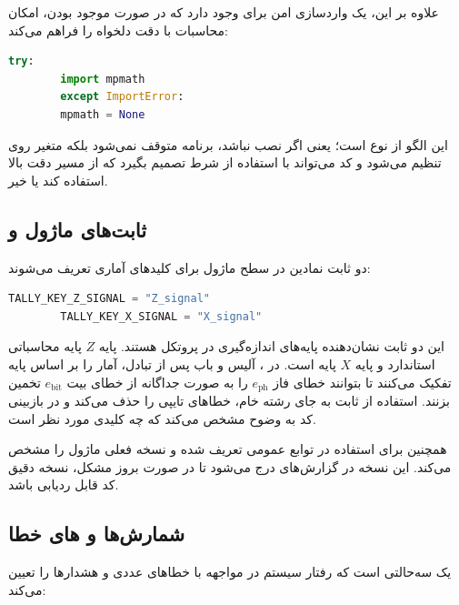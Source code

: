 علاوه بر این، یک واردسازی امن برای  وجود دارد که در صورت موجود بودن، امکان محاسبات با دقت دلخواه را فراهم می‌کند:

\begin{LTR}
	\begin{lstlisting}[language=Python]
		try:
		import mpmath
		except ImportError:
		mpmath = None
	\end{lstlisting}
\end{LTR}

این الگو از نوع  است؛ یعنی اگر  نصب نباشد، برنامه متوقف نمی‌شود بلکه متغیر  روی  تنظیم می‌شود و کد می‌تواند با استفاده از شرط  تصمیم بگیرد که از مسیر دقت بالا استفاده کند یا خیر.

\subsection{ثابت‌های ماژول و \texorpdfstring{}{TypeAlias}}

دو ثابت نمادین در سطح ماژول برای کلیدهای آماری تعریف می‌شوند:

\begin{LTR}
	\begin{lstlisting}[language=Python]
		TALLY_KEY_Z_SIGNAL = "Z_signal"
		TALLY_KEY_X_SIGNAL = "X_signal"
	\end{lstlisting}
\end{LTR}

این دو ثابت نشان‌دهنده پایه‌های اندازه‌گیری در پروتکل  هستند. پایه $Z$ پایه محاسباتی استاندارد و پایه $X$ پایه  است. در ، آلیس و باب پس از تبادل، آمار را بر اساس پایه تفکیک می‌کنند تا بتوانند خطای فاز $e_{\text{ph}}$ را به صورت جداگانه از خطای بیت $e_{\text{bit}}$ تخمین بزنند. استفاده از ثابت به جای رشته خام، خطاهای تایپی را حذف می‌کند و در بازبینی کد به وضوح مشخص می‌کند که چه کلیدی مورد نظر است.

همچنین  برای استفاده در توابع عمومی تعریف شده و  نسخه فعلی ماژول را مشخص می‌کند. این نسخه در گزارش‌های  درج می‌شود تا در صورت بروز مشکل، نسخه دقیق کد قابل ردیابی باشد.

\subsection{شمارش‌ها و های خطا}

 یک  سه‌حالتی است که رفتار سیستم در مواجهه با خطاهای عددی و هشدارها را تعیین می‌کند:


